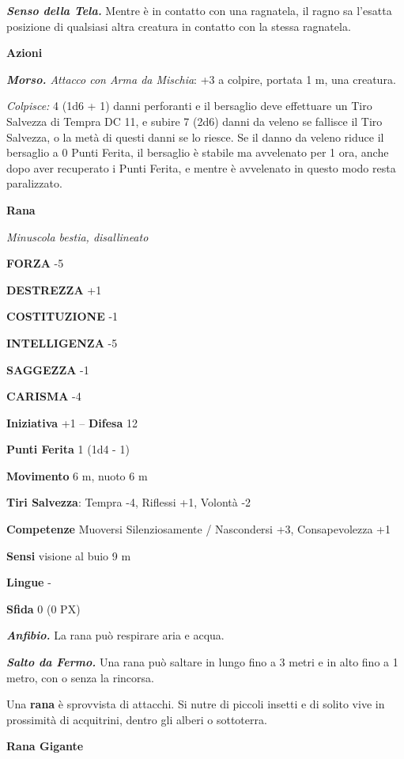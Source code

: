 \begin{multicols}{2}
\textit{\textbf{Senso della Tela.}} Mentre è in contatto con una ragnatela, il ragno sa l'esatta posizione di qualsiasi altra creatura in contatto con la stessa ragnatela.

\textbf{Azioni}

\textit{\textbf{Morso.} Attacco con Arma da Mischia}: +3 a colpire, portata 1 m, una creatura.

\textit{Colpisce:} 4 (1d6 + 1) danni perforanti e il bersaglio deve effettuare un Tiro Salvezza di Tempra DC 11, e subire 7 (2d6) danni da veleno se fallisce il Tiro Salvezza, o la metà di questi danni se lo riesce. Se il danno da veleno riduce il bersaglio a 0 Punti Ferita, il bersaglio è stabile ma avvelenato per 1 ora, anche dopo aver recuperato i Punti Ferita, e mentre è avvelenato in questo modo resta paralizzato.

\medskip\textbf{Rana}

\textit{Minuscola bestia, disallineato}

\textbf{FORZA} -5

\textbf{DESTREZZA} +1

\textbf{COSTITUZIONE} -1

\textbf{INTELLIGENZA} -5

\textbf{SAGGEZZA} -1

\textbf{CARISMA} -4

\textbf{Iniziativa} +1 -- \textbf{Difesa} 12

\textbf{Punti Ferita} 1 (1d4 - 1)

\textbf{Movimento} 6 m, nuoto 6 m

\textbf{Tiri Salvezza}: Tempra -4, Riflessi +1, Volontà -2

\textbf{Competenze} Muoversi Silenziosamente / Nascondersi +3, Consapevolezza +1

\textbf{Sensi} visione al buio 9 m

\textbf{Lingue} -

\textbf{Sfida} 0 (0 PX)

\textit{\textbf{Anfibio.}} La rana può respirare aria e acqua.

\textit{\textbf{Salto da Fermo.}} Una rana può saltare in lungo fino a 3 metri e in alto fino a 1 metro, con o senza la rincorsa.

Una \textbf{rana} è sprovvista di attacchi. Si nutre di piccoli insetti e di solito vive in prossimità di acquitrini, dentro gli alberi o sottoterra.

\medskip\textbf{Rana Gigante}


\end{multicols}
